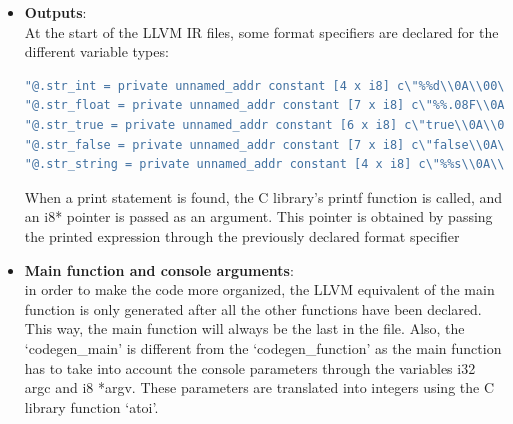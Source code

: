 \documentclass[12pt]{article}
\begin{document}
\begin{itemize}
In the example above, the function call to func() is never executed, as the first operand of the OR operator is True. This is an example of short-circuit evaluation, where the second operand is not evaluated if the first operand is sufficient to determine the result of the expression. This optimization can be applied to both logical AND and OR operators, and can help improve the efficiency of the generated code by avoiding unnecessary evaluations.

\item \textbf{Outputs}: \\
At the start of the LLVM IR files, some format specifiers
are declared for the different variable types:

\begin{center}
    \begin{lstlisting}[language=C, basicstyle=\footnotesize\ttfamily]
"@.str_int = private unnamed_addr constant [4 x i8] c\"%%d\\0A\\00\"\n"
"@.str_float = private unnamed_addr constant [7 x i8] c\"%%.08F\\0A\\00\"\n"
"@.str_true = private unnamed_addr constant [6 x i8] c\"true\\0A\\00\"\n"
"@.str_false = private unnamed_addr constant [7 x i8] c\"false\\0A\\00\"\n"
"@.str_string = private unnamed_addr constant [4 x i8] c\"%%s\\0A\\00\"\n"
    \end{lstlisting}
\end{center}

When a print statement is found,
the C library's printf function is called, and an i8* pointer
is passed as an argument. This pointer is obtained
by passing the printed expression through the previously declared format
specifier

\item \textbf{Main function and console arguments}: \\
in order to make the code more organized, the LLVM equivalent of the main function is only generated
after all the other functions have been declared. This way, the main function will always be the last in the
file. Also, the `codegen\_main' is different from the `codegen\_function' as the main function has to take
into account the console parameters through the variables i32 argc and i8 *argv.
These parameters are translated into integers using the C library function `atoi'.



\end{itemize}
\end{document}

